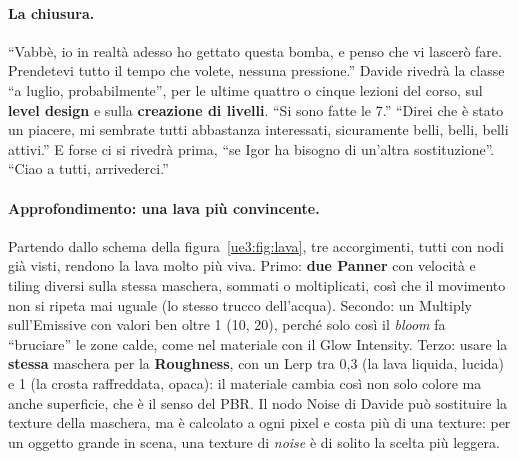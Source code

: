 \paragraph{La chiusura.} ``Vabbè, io in realtà adesso ho gettato questa bomba, e penso
che vi lascerò fare. Prendetevi tutto il tempo che volete, nessuna pressione.'' Davide
rivedrà la classe ``a luglio, probabilmente'', per le ultime quattro o cinque lezioni del
corso, sul \textbf{level design} e sulla \textbf{creazione di livelli}. ``Si sono fatte
le 7.'' ``Direi che è stato un piacere, mi sembrate tutti abbastanza interessati,
sicuramente belli, belli, belli attivi.'' E forse ci si rivedrà prima, ``se Igor ha
bisogno di un'altra sostituzione''. ``Ciao a tutti, arrivederci.''

\paragraph{Approfondimento: una lava più convincente.} Partendo dallo schema della
figura~\ref{ue3:fig:lava}, tre accorgimenti, tutti con nodi già visti, rendono la lava
molto più viva. Primo: \textbf{due Panner} con velocità e tiling diversi sulla stessa
maschera, sommati o moltiplicati, così che il movimento non si ripeta mai uguale (lo
stesso trucco dell'acqua). Secondo: un Multiply sull'Emissive con valori ben oltre 1
(10, 20), perché solo così il \emph{bloom} fa ``bruciare'' le zone calde, come nel
materiale con il Glow Intensity. Terzo: usare la \textbf{stessa} maschera per la
\textbf{Roughness}, con un Lerp tra 0,3 (la lava liquida, lucida) e 1 (la crosta
raffreddata, opaca): il materiale cambia così non solo colore ma anche superficie, che è
il senso del PBR. Il nodo Noise di Davide può sostituire la texture della maschera, ma è
calcolato a ogni pixel e costa più di una texture: per un oggetto grande in scena, una
texture di \emph{noise} è di solito la scelta più leggera.

